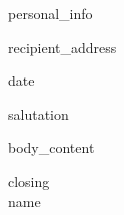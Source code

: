 \documentclass[10pt, letterpaper]{article}
\begin{document}
    {{personal_info}}
    \vspace{0.2cm}

    \vspace{0.5cm}
    \begin{flushleft}
        {{recipient_address}}
    \end{flushleft}

    \vspace{0.2cm}
    \begin{flushright}
        {{date}}
    \end{flushright}

    \vspace{0.5cm}
    {{salutation}}

    \vspace{0.3cm}
    {{body_content}}

    \vspace{0.5cm}
    \begin{flushleft}
        {{closing}} \\
        \vspace{0.2cm}
        {{name}}
    \end{flushleft}
\end{document}
